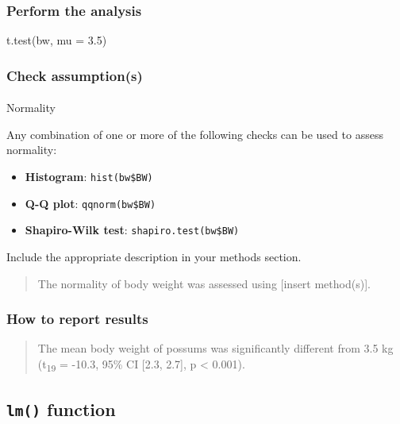 \documentclass[
  letterpaper,
  DIV=11,
  numbers=noendperiod]{scrartcl}
\makeatletter
\let\oldparagraph\paragraph
\renewcommand{\paragraph}{
    \@ifstar
      \xxxParagraphStar
      \xxxParagraphNoStar
  }
\newcommand{\xxxParagraphStar}[1]{\oldparagraph*{#1}\mbox{}}
\newcommand{\xxxParagraphNoStar}[1]{\oldparagraph{#1}\mbox{}}
\newenvironment{Shaded}{\begin{snugshade}}{\end{snugshade}}
\newcommand{\AttributeTok}[1]{\textcolor[rgb]{0.40,0.45,0.13}{#1}}
\newcommand{\FloatTok}[1]{\textcolor[rgb]{0.68,0.00,0.00}{#1}}
\newcommand{\FunctionTok}[1]{\textcolor[rgb]{0.28,0.35,0.67}{#1}}
\newcommand{\NormalTok}[1]{\textcolor[rgb]{0.00,0.23,0.31}{#1}}
\providecommand{\tightlist}{%
  \setlength{\itemsep}{0pt}\setlength{\parskip}{0pt}}\usepackage{longtable,booktabs,array}
\makeatother
\begin{document}
\subsubsection{Perform the analysis}\label{perform-the-analysis}

\begin{Shaded}
\begin{Highlighting}[]
\FunctionTok{t.test}\NormalTok{(bw, }\AttributeTok{mu =} \FloatTok{3.5}\NormalTok{)}
\end{Highlighting}
\end{Shaded}

\subsubsection{Check assumption(s)}\label{check-assumptions}

\paragraph{Normality}\label{normality}

Any combination of one or more of the following checks can be used to
assess normality:

\begin{itemize}
\tightlist
\item
  \textbf{Histogram}: \texttt{hist(bw\$BW)}
\item
  \textbf{Q-Q plot}: \texttt{qqnorm(bw\$BW)}
\item
  \textbf{Shapiro-Wilk test}: \texttt{shapiro.test(bw\$BW)}
\end{itemize}

Include the appropriate description in your methods section.

\begin{quote}
The normality of body weight was assessed using {[}insert method(s){]}.
\end{quote}

\subsubsection{How to report results}\label{how-to-report-results}

\begin{quote}
The mean body weight of possums was significantly different from 3.5 kg
(t\textsubscript{19} = -10.3, 95\% CI {[}2.3, 2.7{]}, p \textless{}
0.001).
\end{quote}

\subsection{\texorpdfstring{\texttt{lm()} function}{lm() function}}
\end{document}
